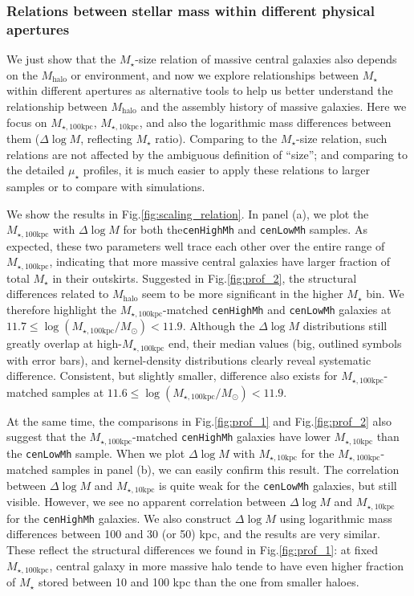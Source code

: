 \documentclass{emulateapj}
\def\rbcg{\texttt{cenHighMh}}
\def\nbcg{\texttt{cenLowMh}}
\def\mstar{{$M_{\star}$}}
\def\mhalo{{$M_{\mathrm{halo}}$}}
\def\minn{{$M_{\star,10\mathrm{kpc}}$}}
\def\mtot{{$M_{\star,100\mathrm{kpc}}$}}
\def\logmtot{{$\log (M_{\star,100\mathrm{kpc}}/M_{\odot})$}}
\def\mden{{$\mu_{\star}$}}
\begin{document}
\begin{CJK*}{UTF8}{gbsn}
\subsubsection{Relations between stellar mass within different physical apertures}
    \label{sssec:m100_m10}
    
    We just show that the \mstar{}-size relation of massive central galaxies also 
    depends on the \mhalo{} or environment, and now we explore relationships between 
    \mstar{} within different apertures as alternative tools to help
    us better understand the relationship between \mhalo{} and the assembly history of 
    massive galaxies.  
    Here we focus on \mtot{}, \minn{}, and also the logarithmic mass differences 
    between them ($\Delta \log M$, reflecting \mstar{} ratio). 
    Comparing to the \mstar{}-size relation, such relations are not affected by the 
    ambiguous definition of ``size''; and comparing to the detailed \mden{} profiles, 
    it is much easier to apply these relations to larger samples or to compare with 
    simulations.
   
    We show the results in Fig.\ref{fig:scaling_relation}.  
    In panel (a), we plot the \mtot{} with $\Delta \log M$ for both the\rbcg{} 
    and \nbcg{} samples. 
    As expected, these two parameters well trace each other over the entire range of
    \mtot{}, indicating that more massive central galaxies have larger 
    fraction of total \mstar{} in their outskirts. 
    Suggested in Fig.\ref{fig:prof_2}, the structural differences related to 
    \mhalo{} seem to be more significant in the higher \mstar{} bin. 
    We therefore highlight the \mtot{}-matched \rbcg{} and \nbcg{} galaxies at 
    $11.7 \leq$\logmtot$< 11.9$. 
    Although the $\Delta \log M$ distributions still greatly overlap at high-\mtot{} 
    end, their median values (big, outlined symbols with error bars),
    and kernel-density distributions clearly reveal systematic difference. 
    Consistent, but slightly smaller, difference also exists for \mtot{}-matched 
    samples at $11.6 \leq$\logmtot$< 11.9$. 
    
    At the same time, the comparisons in Fig.\ref{fig:prof_1} and 
    Fig.\ref{fig:prof_2} also suggest that the \mtot{}-matched \rbcg{} galaxies 
    have lower \minn{} than the \nbcg{} sample. 
    When we plot $\Delta \log M$ with \minn{} for the \mtot{}-matched samples in 
    panel (b), we can easily confirm this result.
    The correlation between $\Delta \log M$ and \minn{} is quite weak for the 
    \nbcg{} galaxies, but still visible. 
    However, we see no apparent correlation between $\Delta \log M$ and \minn{} 
    for the \rbcg{} galaxies. 
    We also construct $\Delta \log M$ using logarithmic mass differences between 
    100 and 30 (or 50) kpc, and the results are very similar.   
    These reflect the structural differences we found in Fig.\ref{fig:prof_1}: 
    at fixed \mtot{}, central galaxy in more massive halo tende to have even higher 
    fraction of \mstar{} stored between 10 and 100 kpc than the one from smaller 
    haloes.
    

\end{CJK*}
\end{document}
